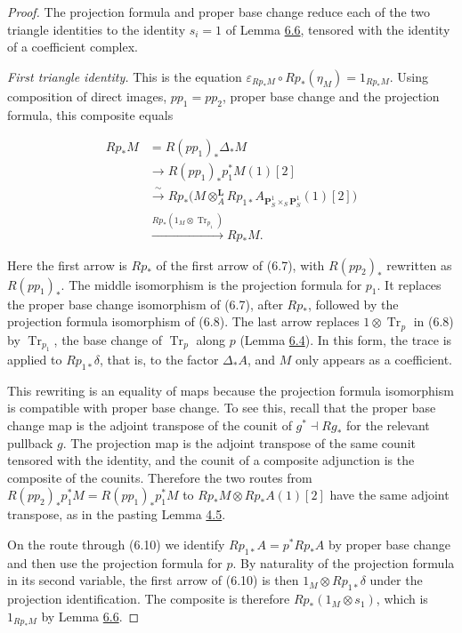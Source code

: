 \documentclass[11pt]{article}
\begin{document}
\begin{proof}[{Proof}]\label{bp535}%
The projection formula and proper base change reduce each of the two triangle identities to the identity \(s_i=1\) of Lemma \hyperref[bp531]{6.6}, tensored with the identity of a coefficient complex.

\emph{First triangle identity.} This is the equation \(\varepsilon_{Rp_*M}\circ Rp_*(\eta_M)=1_{Rp_*M}\). Using composition of direct images, \(pp_1=pp_2\), proper base change and the projection formula, this composite equals

\[
\begin{split}
Rp_*M
&=R(pp_1)_*\Delta_*M\\
&\longrightarrow R(pp_1)_*p_1^*M(1)[2]\\
&\xrightarrow{\ \sim\ }
Rp_*\bigl(M\otimes_A^{\mathbf L}
Rp_{1*}A_{\mathbf P^1_S\times_S\mathbf P^1_S}(1)[2]\bigr)\\
&\xrightarrow{Rp_*(1_M\otimes \operatorname{Tr}_{p_1})}Rp_*M .
\end{split}
\tag{6.10}
\]

Here the first arrow is \(Rp_*\) of the first arrow of (6.7), with \(R(pp_2)_*\) rewritten as \(R(pp_1)_*\). The middle isomorphism is the projection formula for \(p_1\). It replaces the proper base change isomorphism of (6.7), after \(Rp_*\), followed by the projection formula isomorphism of (6.8). The last arrow replaces \(1\otimes\operatorname{Tr}_p\) in (6.8) by \(\operatorname{Tr}_{p_1}\), the base change of \(\operatorname{Tr}_p\) along \(p\) (Lemma \hyperref[bp526]{6.4}). In this form, the trace is applied to \(Rp_{1*}\delta\), that is, to the factor \(\Delta_*A\), and \(M\) only appears as a coefficient.

This rewriting is an equality of maps because the projection formula isomorphism is compatible with proper base change. To see this, recall that the proper base change map is the adjoint transpose of the counit of \(g^*\dashv Rg_*\) for the relevant pullback \(g\). The projection map is the adjoint transpose of the same counit tensored with the identity, and the counit of a composite adjunction is the composite of the counits. Therefore the two routes from \(R(pp_2)_*p_1^*M=R(pp_1)_*p_1^*M\) to \(Rp_*M\otimes Rp_*A(1)[2]\) have the same adjoint transpose, as in the pasting Lemma \hyperref[bp299]{4.5}.

On the route through (6.10) we identify \(Rp_{1*}A=p^*Rp_*A\) by proper base change and then use the projection formula for \(p\). By naturality of the projection formula in its second variable, the first arrow of (6.10) is then \(1_M\otimes Rp_{1*}\delta\) under the projection identification. The composite is therefore \(Rp_*(1_M\otimes s_1)\), which is \(1_{Rp_*M}\) by Lemma \hyperref[bp531]{6.6}.


\end{proof}
\end{document}
